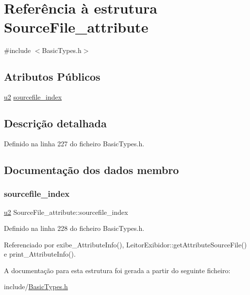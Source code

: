 \hypertarget{structSourceFile__attribute}{}\section{Referência à estrutura Source\+File\+\_\+attribute}
\label{structSourceFile__attribute}


{\ttfamily \#include $<$Basic\+Types.\+h$>$}

\subsection*{Atributos Públicos}
\begin{DoxyCompactItemize}
\item 
\hyperlink{BasicTypes_8h_a732cde1300aafb73b0ea6c2558a7a54f}{u2} \hyperlink{structSourceFile__attribute_a13cba4fc8896792aad81ab821c3244ca}{sourcefile\+\_\+index}
\end{DoxyCompactItemize}


\subsection{Descrição detalhada}


Definido na linha 227 do ficheiro Basic\+Types.\+h.



\subsection{Documentação dos dados membro}
\mbox{\label{structSourceFile__attribute_a13cba4fc8896792aad81ab821c3244ca}} 
\subsubsection{\texorpdfstring{sourcefile\+\_\+index}{sourcefile\_index}}
{\footnotesize\ttfamily \hyperlink{BasicTypes_8h_a732cde1300aafb73b0ea6c2558a7a54f}{u2} Source\+File\+\_\+attribute\+::sourcefile\+\_\+index}



Definido na linha 228 do ficheiro Basic\+Types.\+h.



Referenciado por exibe\+\_\+\+Attribute\+Info(), Leitor\+Exibidor\+::get\+Attribute\+Source\+File() e print\+\_\+\+Attribute\+Info().



A documentação para esta estrutura foi gerada a partir do seguinte ficheiro\+:\begin{DoxyCompactItemize}
\item 
include/\hyperlink{BasicTypes_8h}{Basic\+Types.\+h}\end{DoxyCompactItemize}
